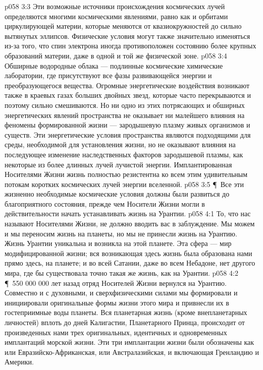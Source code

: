 \vs p058 3:3 Эти возможные источники происхождения космических лучей определяются многими космическими явлениями, равно как и орбитами циркулирующей материи, которые меняются от квазиокружностей до сильно вытянутых эллипсов. Физические условия могут также значительно изменяться из\hyp{}за того, что спин электрона иногда противоположен состоянию более крупных образований материи, даже в одной и той же физической зоне.
\vs p058 3:4 Обширные водородные облака --- подлинные космические химические лаборатории, где присутствуют все фазы развивающейся энергии и преобразующегося вещества. Огромные энергетические воздействия возникают также в краевых газах больших двойных звезд, которые часто перекрываются и поэтому сильно смешиваются. Но ни одно из этих потрясающих и обширных энергетических явлений пространства не оказывает ни малейшего влияния на феномены формированной жизни --- зародышевую плазму живых организмов и существ. Эти энергетические условия пространства являются подходящими для среды, необходимой для установления жизни, но не оказывают влияния на последующее изменение наследственных факторов зародышевой плазмы, как некоторые из более длинных лучей лучистой энергии. Имплантированная Носителями Жизни жизнь полностью резистентна ко всем этим удивительным потокам коротких космических лучей энергии вселенной.
\vs p058 3:5 \P\ Все эти жизненно необходимые космические условия должны были развиться до благоприятного состояния, прежде чем Носители Жизни могли в действительности начать устанавливать жизнь на Урантии.
\vs p058 4:1 То, что нас называют Носителями Жизни, не должно вводить вас в заблуждение. Мы можем и мы переносим жизнь на планеты, но мы не принесли жизнь на Урантию. Жизнь Урантии уникальна и возникла на этой планете. Эта сфера --- мир модифицированной жизни; вся возникающая здесь жизнь была образована нами прямо здесь, на планете; и во всей Сатании, даже во всем Небадоне, нет другого мира, где бы существовала точно такая же жизнь, как на Урантии.
\vs p058 4:2 \P\ 550 000 000 лет назад отряд Носителей Жизни вернулся на Урантию. Совместно и с духовными, и сверхфизическими силами мы формировали и инициировали оригинальные формы жизни этого мира и привнесли их в гостеприимные воды планеты. Вся планетарная жизнь (кроме внепланетарных личностей) вплоть до дней Калигастии, Планетарного Принца, происходит от произведенных нами трех оригинальных, идентичных и одновременных имплантаций морской жизни. Эти три имплантации жизни были обозначены как  или Евразийско\hyp{}Африканская,  или Австралазийская, и  включающая Гренландию и Америки.
